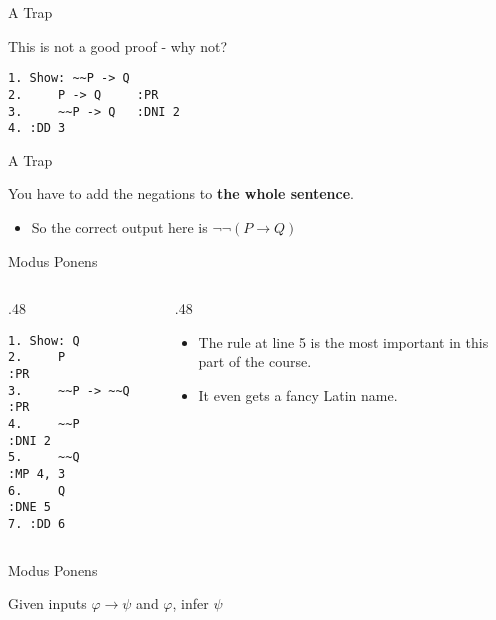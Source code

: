 \documentclass[
  ignorenonframetext,
]{beamer}
\providecommand{\tightlist}{%
  \setlength{\itemsep}{0pt}\setlength{\parskip}{0pt}}
\renewcommand{\,}{\text{, }}
\def\begincols{\begin{columns}}
\def\begincol{\begin{column}}
\def\endcol{\end{column}}
\def\endcols{\end{columns}}
\begin{document}
\begin{frame}[fragile]{A Trap}
\protect\hypertarget{a-trap}{}

This is not a good proof - why not?

\begin{verbatim}
1. Show: ~~P -> Q
2.     P -> Q     :PR
3.     ~~P -> Q   :DNI 2
4. :DD 3
\end{verbatim}

\end{frame}

\begin{frame}{A Trap}
\protect\hypertarget{a-trap-1}{}

You have to add the negations to \textbf{the whole sentence}.

\begin{itemize}
\tightlist
\item
  So the correct output here is \(\neg \neg (P \rightarrow Q)\)
\end{itemize}

\end{frame}

\begin{frame}[fragile]{Modus Ponens}
\protect\hypertarget{modus-ponens}{}

\begincols
\begincol{.48\textwidth}

\begin{verbatim}
1. Show: Q
2.     P          :PR
3.     ~~P -> ~~Q :PR
4.     ~~P        :DNI 2
5.     ~~Q        :MP 4, 3
6.     Q          :DNE 5
7. :DD 6
\end{verbatim}

\endcol
\begincol{.48\textwidth}

\begin{itemize}
\tightlist
\item
  The rule at line 5 is the most important in this part of the course.
\item
  It even gets a fancy Latin name.
\end{itemize}

\endcol
\endcols

\end{frame}

\begin{frame}{Modus Ponens}
\protect\hypertarget{modus-ponens-1}{}

Given inputs \(\varphi \rightarrow \psi\) and \(\varphi\), infer
\(\psi\)

\end{frame}
\end{document}
